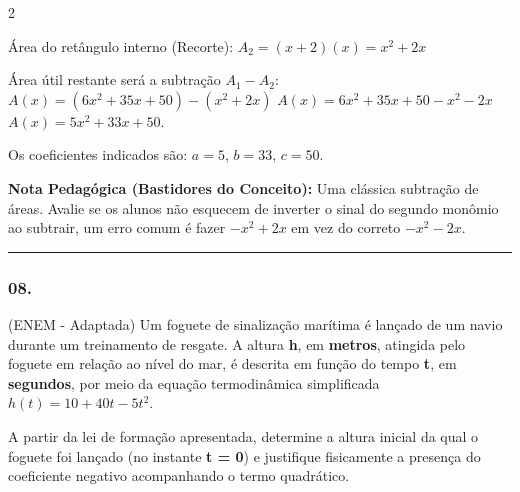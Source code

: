 \begin{multicols*}{2}
\begin{tcolorbox}[colback=CorTitUm!5, colframe=CorTitUm, boxrule=1pt, arc=4pt, left=6pt, right=6pt, top=6pt, bottom=6pt]
    Área do retângulo interno (Recorte): 
    $A_2 = (x + 2)(x) = x^2 + 2x$
    
    Área útil restante será a subtração $A_1 - A_2$:
    $A(x) = (6x^2 + 35x + 50) - (x^2 + 2x)$
    $A(x) = 6x^2 + 35x + 50 - x^2 - 2x$
    $A(x) = 5x^2 + 33x + 50$.
    
    Os coeficientes indicados são: $a = 5$, $b = 33$, $c = 50$.
    \end{tcolorbox}
    \vspace{0.15cm}
    
    \begin{boxexplicacao}
    \textbf{Nota Pedagógica (Bastidores do Conceito):} Uma clássica subtração de áreas. Avalie se os alunos não esquecem de inverter o sinal do segundo monômio ao subtrair, um erro comum é fazer $-x^2 + 2x$ em vez do correto $-x^2 - 2x$.
    \end{boxexplicacao}
\fi

\par\vspace{\espacoQuestao}

\noindent\textcolor{CorLinha}{\rule{\linewidth}{0.5pt}} 
\par\vspace{\espacoPreQuestao}
\subsubsection*{08.} 
\begin{enunciadoLiteral}
(ENEM - Adaptada) Um foguete de sinalização marítima é lançado de um navio durante um treinamento de resgate. A altura \textbf{h}, em \textbf{metros}, atingida pelo foguete em relação ao nível do mar, é descrita em função do tempo \textbf{t}, em \textbf{segundos}, por meio da equação termodinâmica simplificada $h(t) = 10 + 40t - 5t^2$.

A partir da lei de formação apresentada, determine a altura inicial da qual o foguete foi lançado (no instante \textbf{t = 0}) e justifique fisicamente a presença do coeficiente negativo acompanhando o termo quadrático.
\end{enunciadoLiteral}


\end{multicols*}

